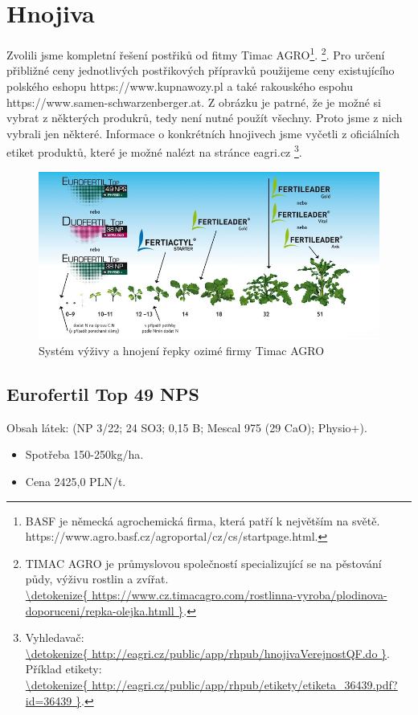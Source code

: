 
\section{Hnojiva}
Zvolili jsme kompletní řešení postřiků od fitmy Timac AGRO\footnote{BASF je německá agrochemická firma, která patří k 
největším na světě.\\https://www.agro.basf.cz/agroportal/cz/cs/startpage.html.}.
\footnote{TIMAC AGRO je průmyslovou společností specializující se na pěstování půdy, výživu rostlin a zvířat.\\\url{\detokenize{
https://www.cz.timacagro.com/rostlinna-vyroba/plodinova-doporuceni/repka-olejka.htmll
}}.}.
Pro určení přibližné ceny jednotlivých postřikových přípravků použijeme ceny existujícího polského eshopu https://www.kupnawozy.pl a také
rakouského espohu https://www.samen-schwarzenberger.at. Z obrázku je patrné, že je možné si vybrat z některých produkrů, tedy není nutné použít všechny.
Proto jsme z nich vybrali jen některé. Informace o konkrétních hnojivech jsme vyčetli z oficiálních etiket produktů,
 které je možné nalézt na stránce eagri.cz
\footnote{Vyhledavač:\\\url{\detokenize{
http://eagri.cz/public/app/rhpub/hnojivaVerejnostQF.do
}}. Příklad etikety:\\\url{\detokenize{
http://eagri.cz/public/app/rhpub/etikety/etiketa_36439.pdf?id=36439
}}.}.
\begin{figure}[ht!]
\centering
\includegraphics[width=170mm]{img/hnojiva}
\caption{Systém výživy a hnojení řepky ozimé firmy Timac AGRO \label{timac_hnojiva}}
\end{figure}

\subsection{Eurofertil Top 49 NPS}
Obsah látek: (NP 3/22; 24 SO3; 0,15 B; Mescal 975 (29 CaO); Physio+).
\begin{itemize}
  \item Spotřeba 150-250kg/ha.
  \item Cena 2425,0 PLN/t.
\end{itemize}

